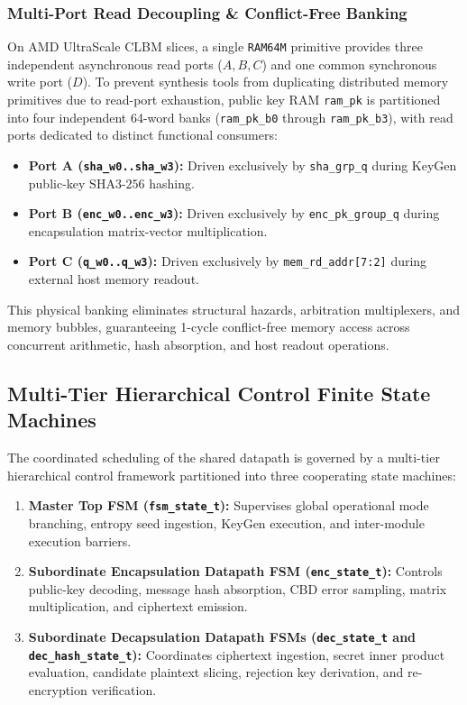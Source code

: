 \subsubsection{Multi-Port Read Decoupling \& Conflict-Free Banking}
On AMD UltraScale CLBM slices, a single \texttt{RAM64M} primitive provides three independent asynchronous read ports ($A, B, C$) and one common synchronous write port ($D$). To prevent synthesis tools from duplicating distributed memory primitives due to read-port exhaustion, public key RAM \texttt{ram\_pk} is partitioned into four independent 64-word banks (\texttt{ram\_pk\_b0} through \texttt{ram\_pk\_b3}), with read ports dedicated to distinct functional consumers:
\begin{itemize}
    \item \textbf{Port A (\texttt{sha\_w0..sha\_w3}):} Driven exclusively by \texttt{sha\_grp\_q} during KeyGen public-key $\text{SHA3-256}$ hashing.
    \item \textbf{Port B (\texttt{enc\_w0..enc\_w3}):} Driven exclusively by \texttt{enc\_pk\_group\_q} during encapsulation matrix-vector multiplication.
    \item \textbf{Port C (\texttt{q\_w0..q\_w3}):} Driven exclusively by \texttt{mem\_rd\_addr[7:2]} during external host memory readout.
\end{itemize}
This physical banking eliminates structural hazards, arbitration multiplexers, and memory bubbles, guaranteeing 1-cycle conflict-free memory access across concurrent arithmetic, hash absorption, and host readout operations.

\subsection{Multi-Tier Hierarchical Control Finite State Machines}
\label{sec:arch_fsm}

The coordinated scheduling of the shared datapath is governed by a multi-tier hierarchical control framework partitioned into three cooperating state machines:
\begin{enumerate}
    \item \textbf{Master Top FSM (\texttt{fsm\_state\_t}):} Supervises global operational mode branching, entropy seed ingestion, KeyGen execution, and inter-module execution barriers.
    \item \textbf{Subordinate Encapsulation Datapath FSM (\texttt{enc\_state\_t}):} Controls public-key decoding, message hash absorption, CBD error sampling, matrix multiplication, and ciphertext emission.
    \item \textbf{Subordinate Decapsulation Datapath FSMs (\texttt{dec\_state\_t} and \texttt{dec\_hash\_state\_t}):} Coordinates ciphertext ingestion, secret inner product evaluation, candidate plaintext slicing, rejection key derivation, and re-encryption verification.
\end{enumerate}

